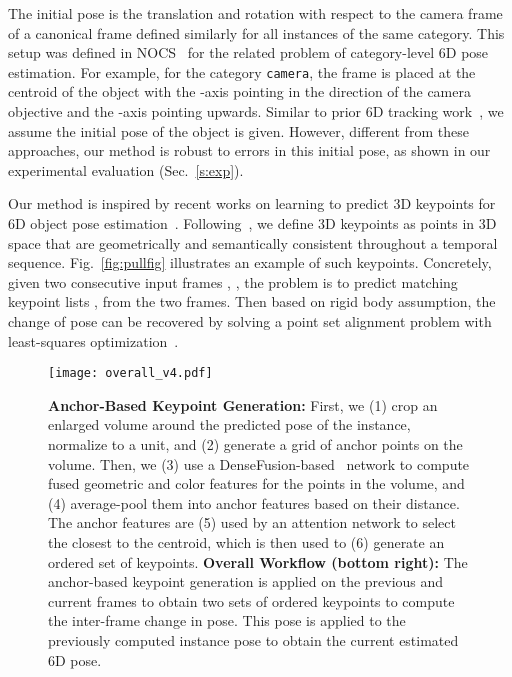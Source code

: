 \documentclass[letterpaper, 10 pt, conference]{ieeeconf}
\begin{document}
The initial pose is the translation and rotation with respect to the camera frame of a canonical frame defined similarly for all instances of the same category. 
This setup was defined in NOCS~\cite{wang2019normalized} for the related problem of category-level 6D pose estimation. 
For example, for the category \texttt{camera}, the frame is placed at the centroid of the object with the -axis pointing in the direction of the camera objective and the -axis pointing upwards. Similar to prior 6D tracking work~\cite{wuthrich2013probabilistic, issac2016depth}, we assume the initial pose of the object is given. 
However, different from these approaches, our method is robust to errors in this initial pose, as shown in our experimental evaluation (Sec.~\ref{s:exp}).

Our method is inspired by recent works on learning to predict 3D keypoints for 6D object pose estimation~\cite{tulsiani2015viewpoints, pavlakos20176,suwajanakorn2018discovery}. Following~\cite{suwajanakorn2018discovery}, we define 3D keypoints as points in 3D space  that are geometrically and semantically consistent throughout a temporal sequence. Fig.~\ref{fig:pullfig} illustrates an example of such keypoints. Concretely, given two consecutive input frames , , the problem is to predict matching keypoint lists ,  from the two frames. Then based on rigid body assumption, the change of pose  can be recovered by solving a point set alignment problem with least-squares optimization~\cite{arun1987least}.


\begin{figure*}[ht]
    \center
    \texttt{[image: overall\_v4.pdf]}
    \vspace{-3mm}
    \caption{\textbf{Anchor-Based Keypoint Generation:} First, we (1) crop an enlarged volume around the predicted pose of the instance, normalize to a unit, and (2) generate a grid of anchor points on the volume. Then, we (3) use a DenseFusion-based~\cite{wang2019densefusion} network to compute fused geometric and color features for the  points in the volume, and (4) average-pool them into  anchor features based on their distance. The anchor features are (5) used by an attention network to select the closest to the centroid, which is then used to (6) generate an ordered set of keypoints. \textbf{Overall Workflow (bottom right):} The anchor-based keypoint generation is applied on the previous and current frames to obtain two sets of ordered keypoints to compute the inter-frame change in pose. This pose is applied to the previously computed instance pose to obtain the current estimated 6D pose.}
    \label{fig:overall}
    \vspace{-4mm}
\end{figure*}
\end{document}
